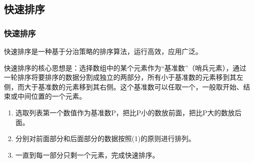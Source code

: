 \subsection{快速排序}


\begin{frame}
    \frametitle{快速排序}
    快速排序是一种基于分治策略的排序算法，运行高效，应用广泛。

    快速排序的核心思想是：选择数组中的某个元素作为“基准数”（哨兵元素），通过一轮排序将要排序的数据分割成独立的两部分，所有小于基准数的元素移到其左侧，而大于基准数的元素移到其右侧。这个基准数可以任取一个，一般取开始、结束或中间位置的一个元素。
    \begin{enumerate}
      \item 选取列表第一个数值作为基准数P，把比P小的数放前面，把比P大的数放后面。
      \item 分别对前面部分和后面部分的数据按照(1)的原则进行排列。
      \item 一直到每一部分只剩一个元素，完成快速排序。
    \end{enumerate}
\end{frame}


